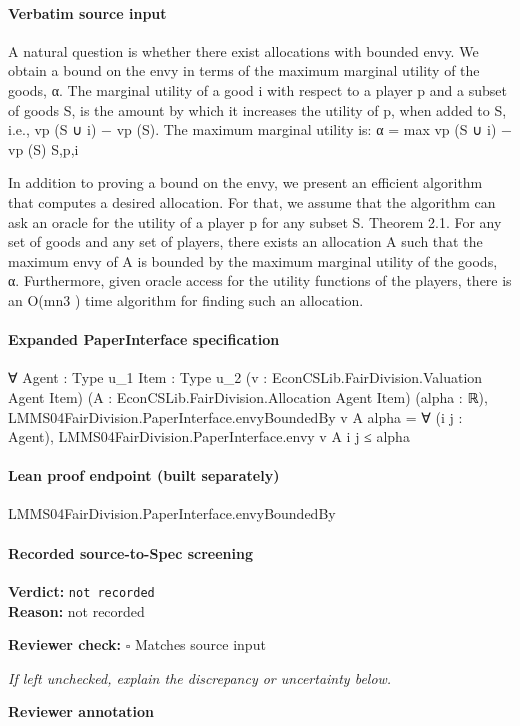 \documentclass[10pt]{article}
\newcommand{\reviewerbox}{%
  \par\noindent\fbox{\parbox{0.96\linewidth}{\rule{0pt}{0.38in}}}\par
}
\newcommand{\reviewmatch}[1]{%
  \par\noindent\textbf{Reviewer check:} $\square$\; #1\par
  \noindent\emph{If left unchecked, explain the discrepancy or uncertainty below.}\par
}
\begin{document}
\paragraph{Verbatim source input}
\begin{ReviewVerbatim}
A natural question is whether there exist allocations with
bounded envy. We obtain a bound on the envy in terms of
the maximum marginal utility of the goods, α. The marginal
utility of a good i with respect to a player p and a subset of
goods S, is the amount by which it increases the utility of
p, when added to S, i.e., vp (S ∪ {i}) − vp (S). The maximum
marginal utility is:
α = max vp (S ∪ {i}) − vp (S)
S,p,i

In addition to proving a bound on the envy, we present an
efficient algorithm that computes a desired allocation. For
that, we assume that the algorithm can ask an oracle for the
utility of a player p for any subset S.
Theorem 2.1. For any set of goods and any set of players, there exists an allocation A such that the maximum envy
of A is bounded by the maximum marginal utility of the
goods, α. Furthermore, given oracle access for the utility
functions of the players, there is an O(mn3 ) time algorithm
for finding such an allocation.
\end{ReviewVerbatim}


\paragraph{Expanded PaperInterface specification}
\begin{ReviewVerbatim}
∀ {Agent : Type u_1} {Item : Type u_2} (v : EconCSLib.FairDivision.Valuation Agent Item)
  (A : EconCSLib.FairDivision.Allocation Agent Item) (alpha : ℝ),
  LMMS04FairDivision.PaperInterface.envyBoundedBy v A alpha =
    ∀ (i j : Agent), LMMS04FairDivision.PaperInterface.envy v A i j ≤ alpha
\end{ReviewVerbatim}

\paragraph{Lean proof endpoint (built separately)}\begin{ReviewVerbatim}
LMMS04FairDivision.PaperInterface.envyBoundedBy
\end{ReviewVerbatim}

\paragraph{Recorded source-to-Spec screening}
\textbf{Verdict:} \texttt{not recorded}
\\
\textbf{Reason:} not recorded
\reviewmatch{Matches source input}
\noindent\textbf{Reviewer annotation}\par
\reviewerbox
\clearpage
\hypertarget{source-claim-6f6c0a542c5926f8}{}
\end{document}

